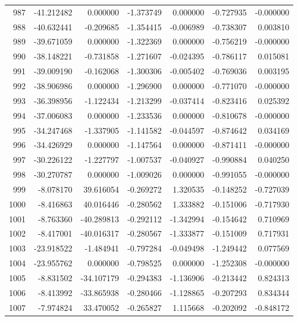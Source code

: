 \begin{tabular}{rrrrrrr}
 987 & -41.212482 &    0.000000 & -1.373749 &   0.000000 &  -0.727935 & -0.000000 \\
 988 & -40.632441 &   -0.209685 & -1.354415 &  -0.006989 &  -0.738307 &  0.003810 \\
 989 & -39.671059 &    0.000000 & -1.322369 &   0.000000 &  -0.756219 & -0.000000 \\
 990 & -38.148221 &   -0.731858 & -1.271607 &  -0.024395 &  -0.786117 &  0.015081 \\
 991 & -39.009190 &   -0.162068 & -1.300306 &  -0.005402 &  -0.769036 &  0.003195 \\
 992 & -38.906986 &    0.000000 & -1.296900 &   0.000000 &  -0.771070 & -0.000000 \\
 993 & -36.398956 &   -1.122434 & -1.213299 &  -0.037414 &  -0.823416 &  0.025392 \\
 994 & -37.006083 &    0.000000 & -1.233536 &   0.000000 &  -0.810678 & -0.000000 \\
 995 & -34.247468 &   -1.337905 & -1.141582 &  -0.044597 &  -0.874642 &  0.034169 \\
 996 & -34.426929 &    0.000000 & -1.147564 &   0.000000 &  -0.871411 & -0.000000 \\
 997 & -30.226122 &   -1.227797 & -1.007537 &  -0.040927 &  -0.990884 &  0.040250 \\
 998 & -30.270787 &    0.000000 & -1.009026 &   0.000000 &  -0.991055 & -0.000000 \\
 999 &  -8.078170 &   39.616054 & -0.269272 &   1.320535 &  -0.148252 & -0.727039 \\
1000 &  -8.416863 &   40.016446 & -0.280562 &   1.333882 &  -0.151006 & -0.717930 \\
1001 &  -8.763360 &  -40.289813 & -0.292112 &  -1.342994 &  -0.154642 &  0.710969 \\
1002 &  -8.417001 &  -40.016317 & -0.280567 &  -1.333877 &  -0.151009 &  0.717931 \\
1003 & -23.918522 &   -1.484941 & -0.797284 &  -0.049498 &  -1.249442 &  0.077569 \\
1004 & -23.955762 &    0.000000 & -0.798525 &   0.000000 &  -1.252308 & -0.000000 \\
1005 &  -8.831502 &  -34.107179 & -0.294383 &  -1.136906 &  -0.213442 &  0.824313 \\
1006 &  -8.413992 &  -33.865938 & -0.280466 &  -1.128865 &  -0.207293 &  0.834344 \\
1007 &  -7.974824 &   33.470052 & -0.265827 &   1.115668 &  -0.202092 & -0.848172 \\

\end{tabular}
